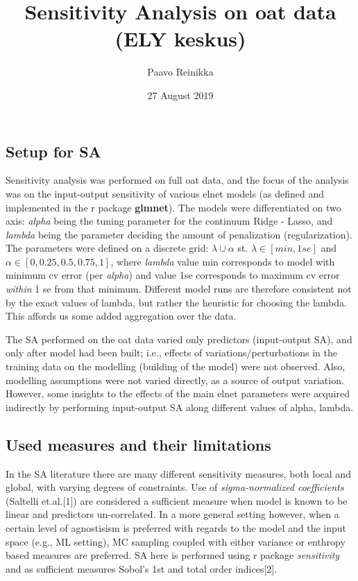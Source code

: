 \documentclass[]{article}
\title{Sensitivity Analysis on oat data (ELY keskus)}
\author{Paavo Reinikka}
\date{27 August 2019}
\begin{document}
\maketitle

\subsection{Setup for SA}\label{setup-for-sa}

Sensitivity analysis was performed on full oat data, and the focus of
the analysis was on the input-output sensitivity of various elnet models
(as defined and implemented in the r package \textbf{glmnet}). The
models were differentiated on two axis: \emph{alpha} being the tuning
parameter for the continuum Ridge - Lasso, and \emph{lambda} being the
parameter deciding the amount of penalization (regularization). The
parameters were defined on a discrete grid: \(\lambda \cup \alpha\) st.
\(\lambda \in [min, 1se]\) and \(\alpha \in [0,0.25,0.5,0.75,1]\), where
\emph{lambda} value min corresponds to model with minimum cv error (per
\emph{alpha}) and value 1se corresponds to maximum cv error
\emph{within} 1 se from that minimum. Different model runs are therefore
consistent not by the exact values of lambda, but rather the heuristic
for choosing the lambda. This affords us some added aggregation over the
data.

The SA performed on the oat data varied only predictors (input-output
SA), and only after model had been built; i.e., effects of
variations/perturbations in the training data on the modelling (building
of the model) were not observed. Also, modelling assumptions were not
varied directly, as a source of output variation. However, some insights
to the effects of the main elnet parameters were acquired indirectly by
performing input-output SA along different values of alpha, lambda.

\subsection{Used measures and their
limitations}\label{used-measures-and-their-limitations}

In the SA literature there are many different sensitivity measures, both
local and global, with varying degrees of constraints. Use of
\emph{sigma-normalized coefficients} (Saltelli et.al.{[}1{]}) are
considered a sufficient measure when model is known to be linear and
predictors un-correlated. In a more general setting however, when a
certain level of agnostisism is preferred with regards to the model and
the input space (e.g., ML setting), MC sampling coupled with either
variance or enthropy based measures are preferred. SA here is performed
using r package \emph{sensitivity} and as sufficient measures Sobol's
1st and total order indices{[}2{]}.
\end{document}
